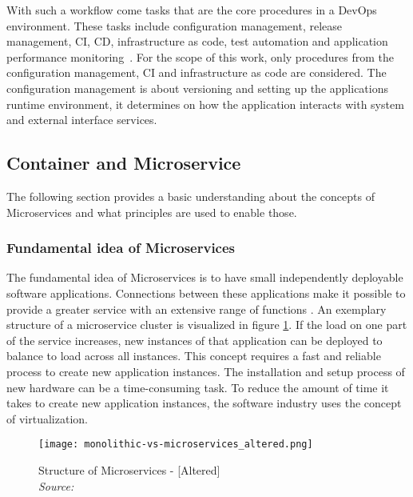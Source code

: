 \documentclass[12pt, a4paper]{article}
\begin{document}
        \noindent With such a workflow come tasks that are the core procedures in a DevOps environment. These tasks include configuration management, release management, \acl*{CI}, \acl{CD}, infrastructure as code, test automation and application performance monitoring~\cite{azuredevops}.\newline
        For the scope of this work, only procedures from the configuration management, \acl*{CI} and infrastructure as code are considered. The configuration management is about versioning and setting up the applications runtime environment, it determines on how the application interacts with system and external interface services.

    \subsection{Container and Microservice}
    The following section provides a basic understanding about the concepts of Microservices and what principles are used to enable those.
        \subsubsection{Fundamental idea of Microservices}
        The fundamental idea of Microservices is to have small independently deployable software applications. Connections between these applications make it possible to provide a greater service with an extensive range of functions \cite{micro}. An exemplary structure of a microservice cluster is visualized in figure \ref{fig::micro}. If the load on one part of the service increases, new instances of that application can be deployed to balance to load across all instances. This concept requires a fast and reliable process to create new application instances.\newline
        The installation and setup process of new hardware can be a time-consuming task. To reduce the amount of time it takes to create new application instances, the software industry uses the concept of virtualization.

        \begin{figure}
            \centering
            \texttt{[image: monolithic-vs-microservices\_altered.png]}
            \caption{Structure of Microservices - [Altered] \\\textit{Source:~\cite{redhat_micro}}}\label{fig::micro}
        \end{figure}
\end{document}
